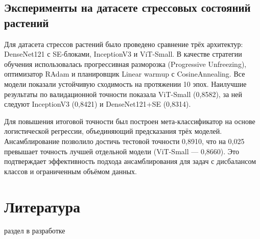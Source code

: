 \documentclass{misisarticle}
\begin{document}
\subsection{Эксперименты на датасете стрессовых состояний растений}
Для датасета стрессов растений было проведено сравнение трёх архитектур: DenseNet121 с SE-блоками, InceptionV3 и ViT-Small. В качестве стратегии обучения использовалась прогрессивная разморозка (Progressive Unfreezing), оптимизатор RAdam и планировщик Linear warmup с CosineAnnealing. Все модели показали устойчивую сходимость на протяжении 10 эпох. Наилучшие результаты по валидационной точности показала ViT-Small (0,8582), за ней следуют InceptionV3 (0,8421) и DenseNet121+SE (0,8314). 

Для повышения итоговой точности был построен мета-классификатор на основе логистической регрессии, объединяющий предсказания трёх моделей. Ансамблирование позволило достичь тестовой точности 0,8910, что на 0,025 превышает точность лучшей отдельной модели (ViT-Small — 0,8660). Это подтверждает эффективность подхода ансамблирования для задач с дисбалансом классов и ограниченным объёмом данных.

\section*{Литература}
раздел в разработке
\end{document}

